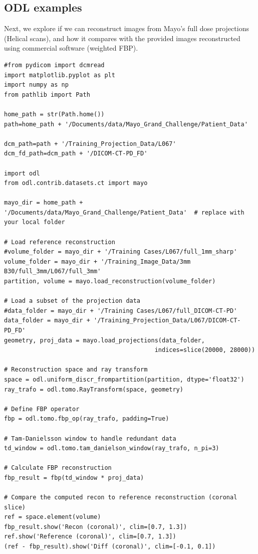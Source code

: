 \documentclass[a4paper, 11pt]{article}
\begin{document}
\subsection{ODL examples}
\label{sec:org8cb164e}
Next, we explore if we can reconstruct images from Mayo's full dose projections (Helical scans), and how it compares with the provided images reconstructed using commercial software (weighted FBP).
\begin{verbatim}
#from pydicom import dcmread
import matplotlib.pyplot as plt
import numpy as np
from pathlib import Path

home_path = str(Path.home())
path=home_path + '/Documents/data/Mayo_Grand_Challenge/Patient_Data'

dcm_path=path + '/Training_Projection_Data/L067'
dcm_fd_path=dcm_path + '/DICOM-CT-PD_FD'

import odl
from odl.contrib.datasets.ct import mayo

mayo_dir = home_path + '/Documents/data/Mayo_Grand_Challenge/Patient_Data'  # replace with your local folder

# Load reference reconstruction
#volume_folder = mayo_dir + '/Training Cases/L067/full_1mm_sharp'
volume_folder = mayo_dir + '/Training_Image_Data/3mm B30/full_3mm/L067/full_3mm'
partition, volume = mayo.load_reconstruction(volume_folder)

# Load a subset of the projection data
#data_folder = mayo_dir + '/Training Cases/L067/full_DICOM-CT-PD'
data_folder = mayo_dir + '/Training_Projection_Data/L067/DICOM-CT-PD_FD'
geometry, proj_data = mayo.load_projections(data_folder,
                                          indices=slice(20000, 28000))

# Reconstruction space and ray transform
space = odl.uniform_discr_frompartition(partition, dtype='float32')
ray_trafo = odl.tomo.RayTransform(space, geometry)

# Define FBP operator
fbp = odl.tomo.fbp_op(ray_trafo, padding=True)

# Tam-Danielsson window to handle redundant data
td_window = odl.tomo.tam_danielson_window(ray_trafo, n_pi=3)

# Calculate FBP reconstruction
fbp_result = fbp(td_window * proj_data)

# Compare the computed recon to reference reconstruction (coronal slice)
ref = space.element(volume)
fbp_result.show('Recon (coronal)', clim=[0.7, 1.3])
ref.show('Reference (coronal)', clim=[0.7, 1.3])
(ref - fbp_result).show('Diff (coronal)', clim=[-0.1, 0.1])


\end{verbatim}
\end{document}
